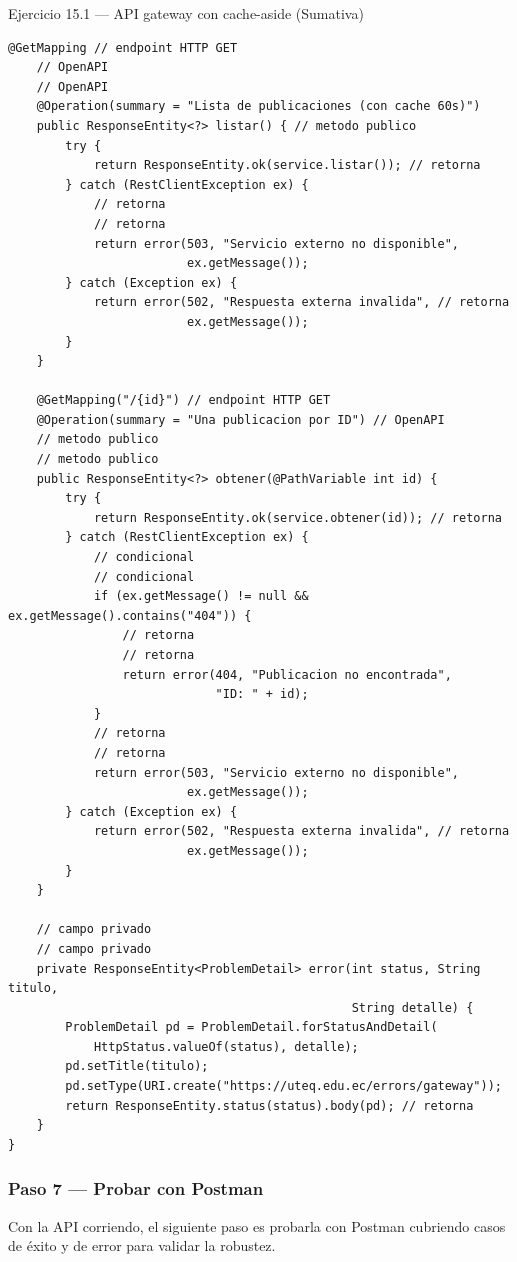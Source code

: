 \begin{cajaejercicio}{Ejercicio 15.1 --- API gateway con cache-aside (Sumativa)}
\begin{lstlisting}[style=java,caption={PostController.java},label=lst:15.19]
    @GetMapping // endpoint HTTP GET
    // OpenAPI
    // OpenAPI
    @Operation(summary = "Lista de publicaciones (con cache 60s)")
    public ResponseEntity<?> listar() { // metodo publico
        try {
            return ResponseEntity.ok(service.listar()); // retorna
        } catch (RestClientException ex) {
            // retorna
            // retorna
            return error(503, "Servicio externo no disponible",
                         ex.getMessage());
        } catch (Exception ex) {
            return error(502, "Respuesta externa invalida", // retorna
                         ex.getMessage());
        }
    }

    @GetMapping("/{id}") // endpoint HTTP GET
    @Operation(summary = "Una publicacion por ID") // OpenAPI
    // metodo publico
    // metodo publico
    public ResponseEntity<?> obtener(@PathVariable int id) {
        try {
            return ResponseEntity.ok(service.obtener(id)); // retorna
        } catch (RestClientException ex) {
            // condicional
            // condicional
            if (ex.getMessage() != null && ex.getMessage().contains("404")) {
                // retorna
                // retorna
                return error(404, "Publicacion no encontrada",
                             "ID: " + id);
            }
            // retorna
            // retorna
            return error(503, "Servicio externo no disponible",
                         ex.getMessage());
        } catch (Exception ex) {
            return error(502, "Respuesta externa invalida", // retorna
                         ex.getMessage());
        }
    }

    // campo privado
    // campo privado
    private ResponseEntity<ProblemDetail> error(int status, String titulo,
                                                String detalle) {
        ProblemDetail pd = ProblemDetail.forStatusAndDetail(
            HttpStatus.valueOf(status), detalle);
        pd.setTitle(titulo);
        pd.setType(URI.create("https://uteq.edu.ec/errors/gateway"));
        return ResponseEntity.status(status).body(pd); // retorna
    }
}
\end{lstlisting}

\subsubsection*{Paso 7 --- Probar con Postman}

Con la API corriendo, el siguiente paso es probarla con
Postman cubriendo casos de éxito y de error para validar la
robustez.



\end{cajaejercicio}
